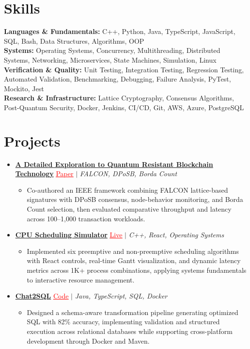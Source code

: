 \documentclass[letterpaper,10pt]{article}
\newcommand{\itemTail}{\vspace{-4pt}}
\newcommand{\sectionGap}{\vspace{-8pt}}
\newcommand{\projGap}{\vspace{3pt}}
\newcommand{\resumeItem}[1]{\item\small{{#1 \itemTail}}}
\newcommand{\resumeProjectHeading}[1]{\item \small #1 \vspace{-2pt}}
\newcommand{\resumeProjectLink}[2]{\href{#1}{\textcolor{red}{\underline{#2}}}}
\newcommand{\resumeSubHeadingListStart}{\begin{itemize}[leftmargin=0.0in, label={}]}
\newcommand{\resumeSubHeadingListEnd}{\end{itemize}}
\newcommand{\resumeProjItemListStart}{\begin{itemize}[leftmargin=0.15in,label=\textbullet,itemsep=3pt,topsep=0pt,parsep=0pt,partopsep=0pt]}
\newcommand{\resumeProjItemListEnd}{\end{itemize}\vspace{-4pt}}
\begin{document}
\section{Skills}
\begin{itemize}[leftmargin=0.15in, label={}]
\small{\item{
\textbf{Languages \& Fundamentals:} C++, Python, Java, TypeScript, JavaScript, SQL, Bash, Data Structures, Algorithms, OOP \\
\textbf{Systems:} Operating Systems, Concurrency, Multithreading, Distributed Systems, Networking, Microservices, State Machines, Simulation, Linux \\
\textbf{Verification \& Quality:} Unit Testing, Integration Testing, Regression Testing, Automated Validation, Benchmarking, Debugging, Failure Analysis, PyTest, Mockito, Jest \\
\textbf{Research \& Infrastructure:} Lattice Cryptography, Consensus Algorithms, Post-Quantum Security, Docker, Jenkins, CI/CD, Git, AWS, Azure, PostgreSQL
}}
\end{itemize}
\sectionGap
\section{Projects}
\resumeSubHeadingListStart
\vspace{-2pt}
\resumeProjectHeading{\href{https://ieeexplore.ieee.org/document/10677253}{\textbf{A Detailed Exploration to Quantum Resistant Blockchain Technology}} \resumeProjectLink{https://ieeexplore.ieee.org/document/10677253}{Paper} $|$ \emph{FALCON, DPoSB, Borda Count}}
\resumeProjItemListStart
\resumeItem{Co-authored an IEEE framework combining FALCON lattice-based signatures with DPoSB consensus, node-behavior monitoring, and Borda Count selection, then evaluated comparative throughput and latency across 100--1,000 transaction workloads.}
\resumeProjItemListEnd
\projGap
\resumeProjectHeading{\href{https://cpu-scheduler-amber.vercel.app/}{\textbf{CPU Scheduling Simulator}} \resumeProjectLink{https://cpu-scheduler-amber.vercel.app/}{Live} $|$ \emph{C++, React, Operating Systems}}
\resumeProjItemListStart
\resumeItem{Implemented six preemptive and non-preemptive scheduling algorithms with React controls, real-time Gantt visualization, and dynamic latency metrics across 1K+ process combinations, applying systems fundamentals to interactive resource management.}
\resumeProjItemListEnd
\projGap
\resumeProjectHeading{\href{https://github.com/SAHAJ-BHADJA/Chat2SQL}{\textbf{Chat2SQL}} \resumeProjectLink{https://github.com/SAHAJ-BHADJA/Chat2SQL}{Code} $|$ \emph{Java, TypeScript, SQL, Docker}}
\resumeProjItemListStart
\resumeItem{Designed a schema-aware transformation pipeline generating optimized SQL with 82\% accuracy, implementing validation and structured execution across relational databases while supporting cross-platform development through Docker and Maven.}
\resumeProjItemListEnd
\resumeSubHeadingListEnd
\end{document}
